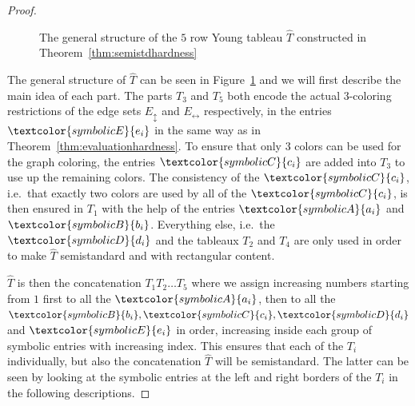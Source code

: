 \documentclass[10pt,a4paper]{article}
\numberwithin{equation}{section}
\theoremstyle{definition}
\newcommand{\Ehor}{{\ensuremath{E_{\leftrightarrow}}}}
\newcommand{\Evert}{{\ensuremath{E_{\updownarrow}}}}
\begin{document}
\begin{proof}
    \begin{figure}[tpb]
        \centering
        \caption{The general structure of the $5$ row Young tableau $\hat{T}$ constructed in Theorem~\ref{thm:semistdhardness}}
        \label{fig:semistdhardnesstructure}
    \end{figure}

    The general structure of $\hat{T}$ can be seen in Figure~\ref{fig:semistdhardnesstructure} and we will first describe the main idea of each part.
    The parts $T_3$ and $T_5$ both encode the actual $3$-coloring restrictions of the edge sets $\Evert$ and $\Ehor$ respectively, in the entries $\textcolor{symbolicE}{e_i}$ in the same way as in Theorem~\ref{thm:evaluationhardness}.
    To ensure that only $3$ colors can be used for the graph coloring, the entries $\textcolor{symbolicC}{c_i}$ are added into $T_3$ to use up the remaining colors.
    The consistency of the $\textcolor{symbolicC}{c_i}$, i.e.\ that exactly two colors are used by all of the $\textcolor{symbolicC}{c_i}$, is then ensured in $T_1$ with the help of the entries $\textcolor{symbolicA}{a_i}$ and $\textcolor{symbolicB}{b_i}$.
    Everything else, i.e.\ the $\textcolor{symbolicD}{d_i}$ and the tableaux $T_2$ and $T_4$ are only used in order to make $\hat{T}$ semistandard and with rectangular content.

    $\hat{T}$ is then the concatenation $T_1 T_2 \dots T_5$ where we assign increasing numbers starting from $1$ first to all the $\textcolor{symbolicA}{a_i}$, then to all the $\textcolor{symbolicB}{b_i}, \textcolor{symbolicC}{c_i}, \textcolor{symbolicD}{d_i}$ and $\textcolor{symbolicE}{e_i}$ in order, increasing inside each group of symbolic entries with increasing index.
    This ensures that each of the $T_i$ individually, but also the concatenation $\hat{T}$ will be semistandard.
    The latter can be seen by looking at the symbolic entries at the left and right borders of the $T_i$ in the following descriptions.


\end{proof}
\end{document}
